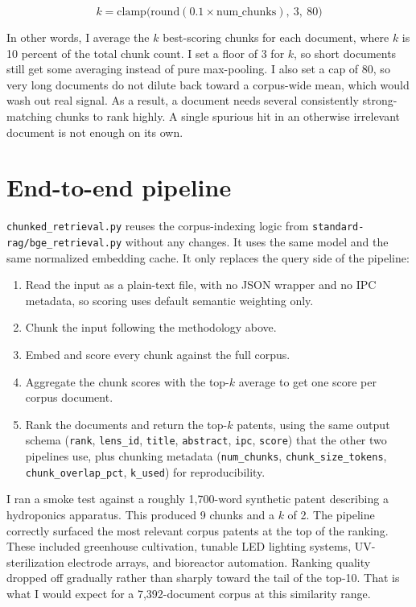 \documentclass[11pt]{article}
\begin{document}
\[
  k = \text{clamp}\big(\text{round}(0.1 \times \text{num\_chunks}),\ 3,\ 80\big)
\]

In other words, I average the $k$ best-scoring chunks for each document, where $k$
is 10 percent of the total chunk count. I set a floor of 3 for $k$, so short
documents still get some averaging instead of pure max-pooling. I also set a cap of
80, so very long documents do not dilute back toward a corpus-wide mean, which would
wash out real signal. As a result, a document needs several consistently
strong-matching chunks to rank highly. A single spurious hit in an otherwise
irrelevant document is not enough on its own.

\section{End-to-end pipeline}

\texttt{chunked\_retrieval.py} reuses the corpus-indexing logic from
\texttt{standard-rag/bge\_retrieval.py} without any changes. It uses the same model
and the same normalized embedding cache. It only replaces the query side of the
pipeline:

\begin{enumerate}
  \item Read the input as a plain-text file, with no JSON wrapper and no IPC
    metadata, so scoring uses default semantic weighting only.
  \item Chunk the input following the methodology above.
  \item Embed and score every chunk against the full corpus.
  \item Aggregate the chunk scores with the top-$k$ average to get one score per
    corpus document.
  \item Rank the documents and return the top-$k$ patents, using the same output
    schema (\texttt{rank}, \texttt{lens\_id}, \texttt{title}, \texttt{abstract},
    \texttt{ipc}, \texttt{score}) that the other two pipelines use, plus chunking
    metadata (\texttt{num\_chunks}, \texttt{chunk\_size\_tokens},
    \texttt{chunk\_overlap\_pct}, \texttt{k\_used}) for reproducibility.
\end{enumerate}

I ran a smoke test against a roughly 1,700-word synthetic patent describing a
hydroponics apparatus. This produced 9 chunks and a $k$ of 2. The pipeline correctly
surfaced the most relevant corpus patents at the top of the ranking. These included
greenhouse cultivation, tunable LED lighting systems, UV-sterilization electrode
arrays, and bioreactor automation. Ranking quality dropped off gradually rather than
sharply toward the tail of the top-10. That is what I would expect for a
7,392-document corpus at this similarity range.
\end{document}
